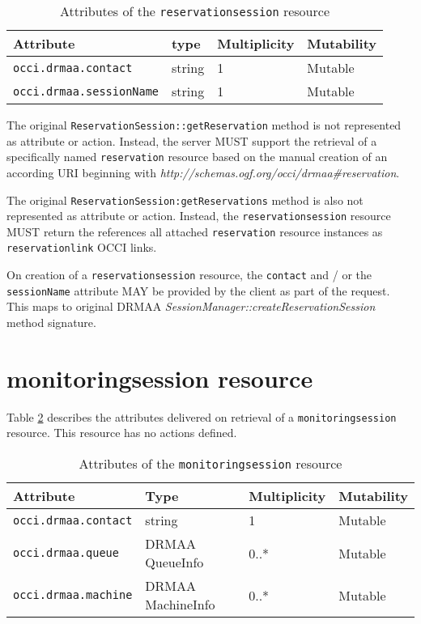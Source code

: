 \documentclass[10pt]{article}
\newcommand{\h}[1]{\lstinline|#1|}
\begin{document}
\begin{table}[ht]
\centering
\begin{tabularx}{\textwidth}{|l|X|X|X|}
\hline
Attribute       & type   & Multiplicity & Mutability \\
\hline
\h{occi.drmaa.contact}     & string       & 1            & Mutable    \\ %
\h{occi.drmaa.sessionName} & string       & 1            & Mutable    \\ %
\hline
\end{tabularx}
\caption{Attributes of the \h{reservationsession} resource}
\label{tab:reservationsessionattributes}
\end{table}

The original \h{ReservationSession::getReservation} method is not represented as attribute or action. Instead, the server MUST support the retrieval of a specifically named \h{reservation} resource based on the manual creation of an according URI beginning with \emph{http://schemas.ogf.org/occi/drmaa\#reservation}. 

The original \h{ReservationSession:getReservations} method is also not represented as attribute or action. Instead, the \h{reservationsession} resource MUST return the references all attached \h{reservation} resource instances as \h{reservationlink} OCCI links. 

On creation of a \h{reservationsession} resource, the \h{contact} and / or the \h{sessionName} attribute MAY be provided by the client as part of the request. This maps to original DRMAA \emph{SessionManager::createReservationSession} method signature.


\section{monitoringsession resource}

Table \ref{tab:monitoringsessionattributes} describes the attributes delivered on retrieval of a \h{monitoringsession} resource. This resource has no actions defined.

\begin{table}[ht]
\centering
\begin{tabularx}{\textwidth}{|l|X|X|X|}
\hline
Attribute    & Type  & Multiplicity & Mutability \\
\hline
\h{occi.drmaa.contact}  & string            & 1            & Mutable    \\ 
\h{occi.drmaa.queue}    & DRMAA QueueInfo   & 0..*         & Mutable    \\ 
\h{occi.drmaa.machine}  & DRMAA MachineInfo & 0..*         & Mutable    \\ 
\hline
\end{tabularx}
\caption{Attributes of the \h{monitoringsession} resource}
\label{tab:monitoringsessionattributes}
\end{table}
\end{document}
